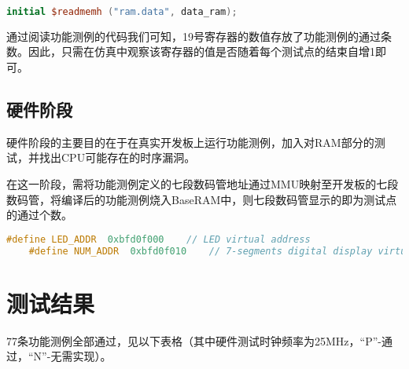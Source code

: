 \begin{lstlisting}[language=verilog, caption={ram.v的initial块}]
     initial $readmemh ("ram.data", data_ram);
\end{lstlisting}

通过阅读功能测例的代码我们可知，19号寄存器的数值存放了功能测例的通过条数。因此，只需在仿真中观察该寄存器的值是否随着每个测试点的结束自增1即可。

\subsection{硬件阶段}

硬件阶段的主要目的在于在真实开发板上运行功能测例，加入对RAM部分的测试，并找出CPU可能存在的时序漏洞。

在这一阶段，需将功能测例定义的七段数码管地址通过MMU映射至开发板的七段数码管，将编译后的功能测例烧入BaseRAM中，则七段数码管显示的即为测试点的通过个数。

\begin{lstlisting}[language=c, caption={start.S中定义的LED与七段数码管地址}]
    #define LED_ADDR  0xbfd0f000    // LED virtual address
    #define NUM_ADDR  0xbfd0f010    // 7-segments digital display virtual address
\end{lstlisting}

\section{测试结果}

77条功能测例全部通过，见以下表格（其中硬件测试时钟频率为25MHz，``P''-通过，``N''-无需实现）。

